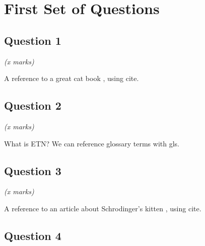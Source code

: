 \documentclass[11pt,fleqn]{book} %
\begin{document}

\printglossaries




\chapter{First Set of Questions}

\section{Question 1}

\begin{flushright}
    \textit{(x marks)}
\end{flushright}

\vspace{20px}

A reference to a great cat book \cite{hay2010}, using cite.


\section{Question 2}

\begin{flushright}
    \textit{(x marks)}
\end{flushright}

\vspace{20px}

What is \gls{ETN}? We can reference glossary terms with gls.

\section{Question 3}

\begin{flushright}
    \textit{(x marks)}
\end{flushright}

\vspace{20px}

A reference to an article about Schrodinger's kitten \cite{mikheev2019}, using cite.


\section{Question 4}
\end{document}
